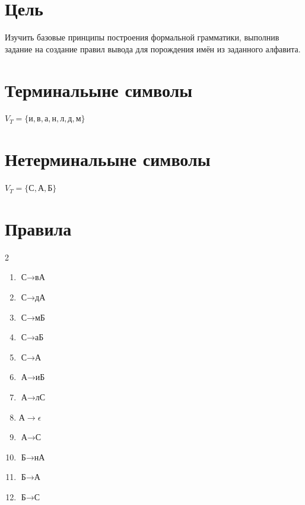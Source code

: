 \documentclass[oneside,a4paper,14pt]{extarticle}
\begin{document}
\section*{Цель}
Изучить базовые принципы построения формальной грамматики, выполнив задание на создание правил вывода для порождения имён из заданного алфавита.


\section*{Терминальыне символы}
$V_T = \{ \text{и}, \text{в}, \text{а}, \text{н},\text{л},\text{д},\text{м} \}$


\section*{Нетерминальыне символы}
$V_T = \{ \text{С}, \text{А}, \text{Б}\}$


\section*{Правила}
\begin{multicols}{2}
\begin{enumerate}
    \item $ \text{С} \to \text{в}\text{А}$
    \item $ \text{С} \to \text{д}\text{А}$
    \item $ \text{С} \to \text{м}\text{Б}$
    \item $ \text{С} \to \text{а}\text{Б}$
    \item $ \text{С} \to \text{А}$
    \item $ \text{А} \to \text{и}\text{Б}$
    \item $ \text{А} \to \text{л}\text{С}$
    \item $ \text{А} \to \epsilon$
    \item $ \text{А} \to \text{С}$
    \item $ \text{Б} \to \text{н}\text{А}$
    \item $ \text{Б} \to \text{А}$
    \item $ \text{Б} \to \text{С}$
\end{enumerate}
\end{multicols}
\end{document}
